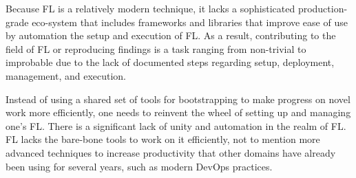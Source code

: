 Because FL is a relatively modern technique,
it lacks a sophisticated production-grade eco-system that includes
frameworks and libraries that improve ease of use by automation the setup and execution of FL.
As a result, contributing to the field of FL or reproducing findings is a task
ranging from non-trivial to improbable due to the lack of documented steps regarding setup,
deployment, management, and execution.

Instead of using a shared set of tools for bootstrapping to make progress on novel work more efficiently,
one needs to reinvent the wheel of setting up and managing one’s FL.
There is a significant lack of unity and automation in the realm of FL.
FL lacks the bare-bone tools to work on it efficiently,
not to mention more advanced techniques to increase productivity that
other domains have already been using for several years, such as modern DevOps practices.